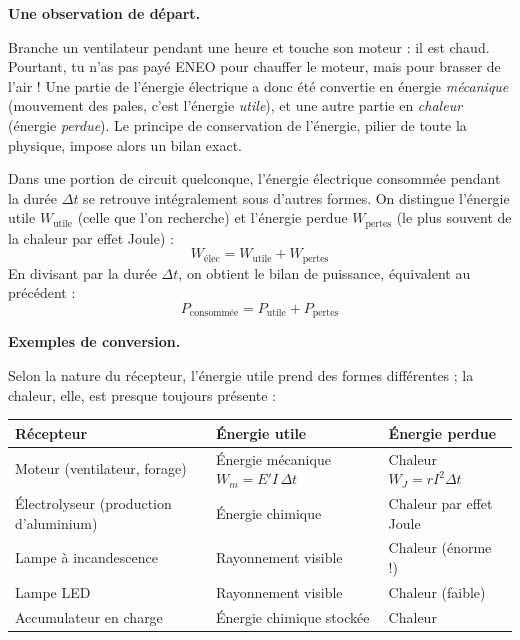 \documentclass[11pt]{article}
\newcommand{\cle}[1]{{\popxbold\color{popdark}#1}}
\begin{document}
\textbf{Une observation de départ.}\par
Branche un ventilateur pendant une heure et touche son moteur : il est chaud. Pourtant, tu n'as pas payé ENEO pour chauffer le moteur, mais pour brasser de l'air ! Une partie de l'énergie électrique a donc été convertie en énergie \emph{mécanique} (mouvement des pales, c'est l'énergie \emph{utile}), et une autre partie en \emph{chaleur} (énergie \emph{perdue}). Le principe de conservation de l'énergie, pilier de toute la physique, impose alors un bilan exact.

\begin{propriete}
Dans une portion de circuit quelconque, l'énergie électrique consommée pendant la durée $\Delta t$ se retrouve intégralement sous d'autres formes. On distingue l'énergie \cle{utile} $W_{\text{utile}}$ (celle que l'on recherche) et l'énergie \cle{perdue} $W_{\text{pertes}}$ (le plus souvent de la chaleur par effet Joule) :
\[ W_{\text{élec}} = W_{\text{utile}} + W_{\text{pertes}} \]
En divisant par la durée $\Delta t$, on obtient le bilan de \cle{puissance}, équivalent au précédent :
\[ P_{\text{consommée}} = P_{\text{utile}} + P_{\text{pertes}} \]
\end{propriete}

\textbf{Exemples de conversion.}\par
Selon la nature du récepteur, l'énergie utile prend des formes différentes ; la chaleur, elle, est presque toujours présente :

\begin{center}
\begin{tabularx}{\linewidth}{|l|X|X|}
\hline
\rowcolor{popblueL} \textbf{Récepteur} & \textbf{Énergie utile} & \textbf{Énergie perdue} \\
\hline
Moteur (ventilateur, forage) & Énergie mécanique $W_m = E' I\, \Delta t$ & Chaleur $W_J = r I^2 \Delta t$ \\
\hline
Électrolyseur (production d'aluminium) & Énergie chimique & Chaleur par effet Joule \\
\hline
Lampe à incandescence & Rayonnement visible & Chaleur (énorme !) \\
\hline
Lampe LED & Rayonnement visible & Chaleur (faible) \\
\hline
Accumulateur en charge & Énergie chimique stockée & Chaleur \\
\hline
\end{tabularx}
\end{center}
\end{document}
